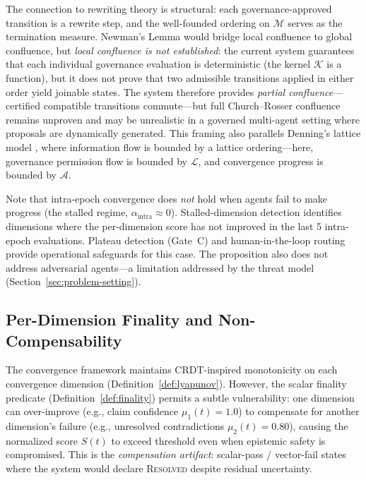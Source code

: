 \documentclass[11pt]{article}
\begin{document}
The connection to rewriting theory \cite{baader1998} is structural: each governance-approved transition is a rewrite step, and the well-founded ordering on $\mathcal{M}$ serves as the termination measure. Newman's Lemma \cite{newman1942} would bridge local confluence to global confluence, but \emph{local confluence is not established}: the current system guarantees that each individual governance evaluation is deterministic (the kernel $\mathcal{K}$ is a function), but it does not prove that two admissible transitions applied in either order yield joinable states. The system therefore provides \emph{partial confluence}---certified compatible transitions commute---but full Church--Rosser confluence remains unproven and may be unrealistic in a governed multi-agent setting where proposals are dynamically generated. This framing also parallels Denning's lattice model \cite{denning1976}, where information flow is bounded by a lattice ordering---here, governance permission flow is bounded by $\mathcal{L}$, and convergence progress is bounded by $\mathcal{A}$.

Note that intra-epoch convergence does \emph{not} hold when agents fail to make progress (the stalled regime, $\alpha_{\text{intra}} \approx 0$). Stalled-dimension detection identifies dimensions where the per-dimension score has not improved in the last 5 intra-epoch evaluations. Plateau detection (Gate~C) and human-in-the-loop routing provide operational safeguards for this case. The proposition also does not address adversarial agents---a limitation addressed by the threat model (Section~\ref{sec:problem-setting}).

\subsection{Per-Dimension Finality and Non-Compensability}
\label{sec:vector-finality}

The convergence framework maintains CRDT-inspired monotonicity on each convergence dimension
(Definition~\ref{def:lyapunov}). However, the scalar finality predicate (Definition~\ref{def:finality})
permits a subtle vulnerability: one dimension can over-improve (e.g., claim confidence $\mu_1(t) = 1.0$)
to compensate for another dimension's failure (e.g., unresolved contradictions $\mu_2(t) = 0.80$),
causing the normalized score $S(t)$ to exceed threshold even when epistemic safety is compromised.
This is the \emph{compensation artifact}: scalar-pass / vector-fail states where the system would
declare \textnormal{\textsc{Resolved}} despite residual uncertainty.
\end{document}
